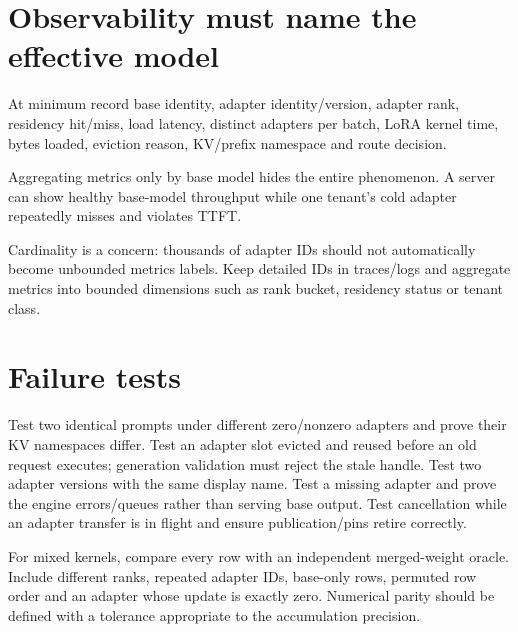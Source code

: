 \section{Observability must name the effective model}

At minimum record base identity, adapter identity/version, adapter rank, residency
hit/miss, load latency, distinct adapters per batch, LoRA kernel time, bytes loaded,
eviction reason, KV/prefix namespace and route decision.

Aggregating metrics only by base model hides the entire phenomenon. A server can show
healthy base-model throughput while one tenant's cold adapter repeatedly misses and
violates TTFT.

Cardinality is a concern: thousands of adapter IDs should not automatically become
unbounded metrics labels. Keep detailed IDs in traces/logs and aggregate metrics into
bounded dimensions such as rank bucket, residency status or tenant class.

\section{Failure tests}

Test two identical prompts under different zero/nonzero adapters and prove their KV
namespaces differ. Test an adapter slot evicted and reused before an old request
executes; generation validation must reject the stale handle. Test two adapter versions
with the same display name. Test a missing adapter and prove the engine errors/queues
rather than serving base output. Test cancellation while an adapter transfer is in
flight and ensure publication/pins retire correctly.

For mixed kernels, compare every row with an independent merged-weight oracle. Include
different ranks, repeated adapter IDs, base-only rows, permuted row order and an
adapter whose update is exactly zero. Numerical parity should be defined with a
tolerance appropriate to the accumulation precision.



